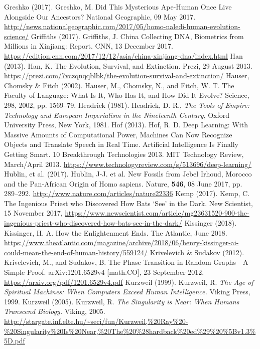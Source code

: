\begin{multicols}{2}
\begin{thebibliography}{99}
 Greshko (2017). Greshko, M. Did This Mysterious Ape-Human Once Live Alongside Our Ancestors? National Geographic, 09 May 2017. \url{http://news.nationalgeographic.com/2017/05/homo-naledi-human-evolution-science/}
 Griffiths (2017). Griffiths, J. China Collecting DNA, Biometrics from Millions in Xinjiang: Report. CNN, 13 December 2017. \url{https://edition.cnn.com/2017/12/12/asia/china-xinjiang-dna/index.html}
 Han (2013). Han, K. The Evolution, Survival, and Extinction. Prezi, 29 August 2013. \url{https://prezi.com/7vczqnqqblbk/the-evolution-survival-and-extinction/}
 Hauser, Chomsky \& Fitch (2002). Hauser, M., Chomsky, N., and Fitch, W. T. The Faculty of Language: What Is It, Who Has It, and How Did It Evolve? Science, 298, 2002, pp. 1569--79.
 Headrick (1981). Headrick, D. R., \textit{The Tools of Empire: Technology and European Imperialism in the Nineteenth Century}, Oxford University Press, New York, 1981.
 Hof (2013). Hof, R. D. Deep Learning: With Massive Amounts of Computational Power, Machines Can Now Recognize Objects and Translate Speech in Real Time. Artificial Intelligence Is Finally Getting Smart. 10 Breakthrough Technologies 2013. MIT Technology Review, March/April 2013. \url{https://www.technologyreview.com/s/513696/deep-learning/}
 Hublin, et al. (2017). Hublin, J-J. et al. New Fossils from Jebel Irhoud, Morocco and the Pan-African Origin of Homo sapiens. Nature, \textbf{546}, 08 June 2017, pp. 289--292. \url{http://www.nature.com/articles/nature22336}
 Kemp (2017). Kemp, C. The Ingenious Priest who Discovered How Bats ‘See’ in the Dark. New Scientist, 15 November 2017, \url{https://www.newscientist.com/article/mg23631520-900-the-ingenious-priest-who-discovered-how-bats-see-in-the-dark/}
 Kissinger (2018). Kissinger, H. A. How the Enlightenment Ends. The Atlantic, June 2018. \url{https://www.theatlantic.com/magazine/archive/2018/06/henry-kissinger-ai-could-mean-the-end-of-human-history/559124/}
 Krivelevich \& Sudakov (2012). Krivelevich, M., and Sudakov, B. The Phase Transition in Random Graphs - A Simple Proof. arXiv:1201.6529v4 [math.CO], 23 September 2012. \url{https://arxiv.org/pdf/1201.6529v4.pdf}
 Kurzweil (1999). Kurzweil, R. \textit{The Age of Spiritual Machines: When Computers Exceed Human Intelligence.} Viking Press, 1999.
 Kurzweil (2005). Kurzweil, R. \textit{The Singularity is Near: When Humans Transcend Biology.} Viking, 2005. \url{http://stargate.inf.elte.hu/~seci/fun/Kurzweil,%20Ray%20-%20Singularity%20Is%20Near,%20The%20%28hardback%20ed%29%20%5Bv1.3%5D.pdf}

\end{thebibliography}
\end{multicols}
